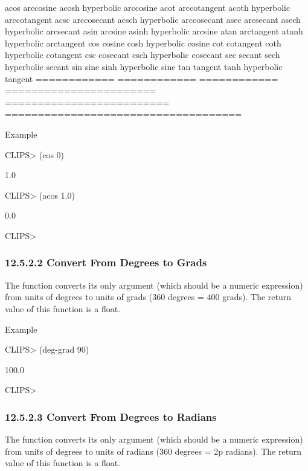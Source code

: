 \documentclass[letterpaper,10pt,english]{sphinxmanual}
\begin{document}
acos         arccosine    acosh        hyperbolic arccosine
acot         arccotangent acoth        hyperbolic arccotangent
acsc         arccosecant  acsch        hyperbolic arccosecant
asec         arcsecant    asech        hyperbolic arcsecant
asin         arcsine      asinh        hyperbolic arcsine
atan         arctangent   atanh        hyperbolic arctangent
cos          cosine       cosh         hyperbolic cosine
cot          cotangent    coth         hyperbolic cotangent
csc          cosecant     csch         hyperbolic cosecant
sec          secant       sech         hyperbolic secant
sin          sine         sinh         hyperbolic sine
tan          tangent      tanh         hyperbolic tangent
============ ============ ============ =======================
========================= ====================================

Example

CLIPS\textgreater{} (cos 0)

1.0

CLIPS\textgreater{} (acos 1.0)

0.0

CLIPS\textgreater{}


\subsubsection{12.5.2.2 Convert From Degrees to Grads}
\label{\detokenize{actions:convert-from-degrees-to-grads}}
The  function converts its only argument (which should be a
numeric expression) from units of degrees to units of grads (360 degrees
= 400 grads). The return value of this function is a float.


\begin{sphinxVerbatim}[commandchars=\\\{\}]
 
\end{sphinxVerbatim}

Example

CLIPS\textgreater{} (deg-grad 90)

100.0

CLIPS\textgreater{}


\subsubsection{12.5.2.3 Convert From Degrees to Radians}
\label{\detokenize{actions:convert-from-degrees-to-radians}}
The  function converts its only argument (which should be a
numeric expression) from units of degrees to units of radians (360
degrees = 2p radians). The return value of this function is a float.
\end{document}
